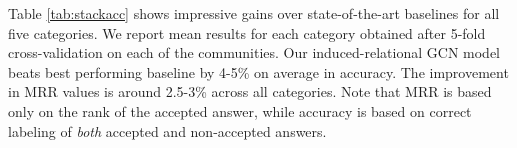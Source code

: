 Table \ref{tab:stackacc} shows impressive gains over state-of-the-art baselines for all five categories. We report mean results for each category obtained after 5-fold cross-validation on each of the communities. Our induced-relational GCN model beats best performing baseline by 4-5\% on average in accuracy. The improvement in MRR values is around 2.5-3\% across all categories. Note that MRR is based only on the rank of the accepted answer, while accuracy is based on correct labeling of \emph{both} accepted and non-accepted answers.

